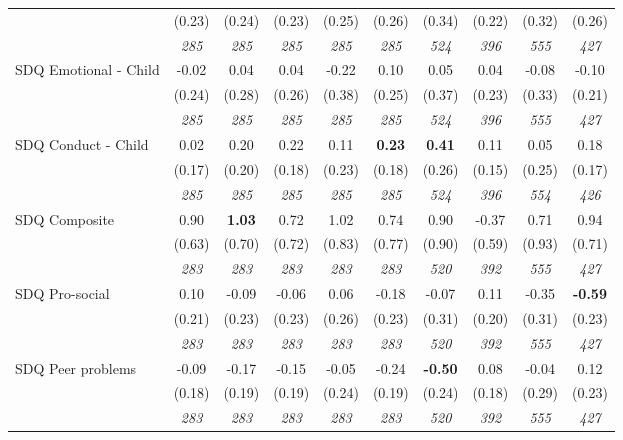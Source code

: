 \begin{tabular}{l c c c c c c c c c}
& (0.23) & (0.24) & (0.23) & (0.25) & (0.26) & (0.34) & (0.22) & (0.32) & (0.26) \\
& \textit{ 285 } & \textit{ 285 } & \textit{ 285 } & \textit{ 285 } & \textit{ 285 } & \textit{ 524 } & \textit{ 396 } & \textit{ 555 } & \textit{ 427 } \\
SDQ Emotional - Child & -0.02 & 0.04 & 0.04 & -0.22 & 0.10 & 0.05 & 0.04 & -0.08 & -0.10 \\
& (0.24) & (0.28) & (0.26) & (0.38) & (0.25) & (0.37) & (0.23) & (0.33) & (0.21) \\
& \textit{ 285 } & \textit{ 285 } & \textit{ 285 } & \textit{ 285 } & \textit{ 285 } & \textit{ 524 } & \textit{ 396 } & \textit{ 555 } & \textit{ 427 } \\
SDQ Conduct - Child & 0.02 & 0.20 & 0.22 & 0.11 & \textbf{0.23} & \textbf{ 0.41 } & 0.11 & 0.05 & 0.18 \\
& (0.17) & (0.20) & (0.18) & (0.23) & (0.18) & (0.26) & (0.15) & (0.25) & (0.17) \\
& \textit{ 285 } & \textit{ 285 } & \textit{ 285 } & \textit{ 285 } & \textit{ 285 } & \textit{ 524 } & \textit{ 396 } & \textit{ 554 } & \textit{ 426 } \\
SDQ Composite & 0.90 & \textbf{ 1.03 } & 0.72 & 1.02 & 0.74 & 0.90 & -0.37 & 0.71 & 0.94 \\
& (0.63) & (0.70) & (0.72) & (0.83) & (0.77) & (0.90) & (0.59) & (0.93) & (0.71) \\
& \textit{ 283 } & \textit{ 283 } & \textit{ 283 } & \textit{ 283 } & \textit{ 283 } & \textit{ 520 } & \textit{ 392 } & \textit{ 555 } & \textit{ 427 } \\
SDQ Pro-social & 0.10 & -0.09 & -0.06 & 0.06 & -0.18 & -0.07 & 0.11 & -0.35 & \textbf{-0.59} \\
& (0.21) & (0.23) & (0.23) & (0.26) & (0.23) & (0.31) & (0.20) & (0.31) & (0.23) \\
& \textit{ 283 } & \textit{ 283 } & \textit{ 283 } & \textit{ 283 } & \textit{ 283 } & \textit{ 520 } & \textit{ 392 } & \textit{ 555 } & \textit{ 427 } \\
SDQ Peer problems & -0.09 & -0.17 & -0.15 & -0.05 & -0.24 & \textbf{ -0.50 } & 0.08 & -0.04 & 0.12 \\
& (0.18) & (0.19) & (0.19) & (0.24) & (0.19) & (0.24) & (0.18) & (0.29) & (0.23) \\
& \textit{ 283 } & \textit{ 283 } & \textit{ 283 } & \textit{ 283 } & \textit{ 283 } & \textit{ 520 } & \textit{ 392 } & \textit{ 555 } & \textit{ 427 } \\

\end{tabular}
